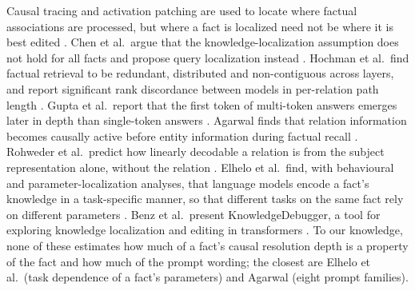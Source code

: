 Causal tracing and activation patching are used to locate where factual associations are processed, but where a fact is localized need not be where it is best edited \cite{hase2023}.
Chen et al.\ argue that the knowledge-localization assumption does not hold for all facts and propose query localization instead \cite{chen2024}.
Hochman et al.\ find factual retrieval to be redundant, distributed and non-contiguous across layers, and report significant rank discordance between models in per-relation path length \cite{hochman2026}.
Gupta et al.\ report that the first token of multi-token answers emerges later in depth than single-token answers \cite{gupta2025}.
Agarwal finds that relation information becomes causally active before entity information during factual recall \cite{agarwal2026}.
Rohweder et al.\ predict how linearly decodable a relation is from the subject representation alone, without the relation \cite{rohweder2026}.
Elhelo et al.\ find, with behavioural and parameter-localization analyses, that language models encode a fact's knowledge in a task-specific manner, so that different tasks on the same fact rely on different parameters \cite{elhelo2026}.
Benz et al.\ present KnowledgeDebugger, a tool for exploring knowledge localization and editing in transformers \cite{benz2026}.
To our knowledge, none of these estimates how much of a fact's causal resolution depth is a property of the fact and how much of the prompt wording; the closest are Elhelo et al.\ (task dependence of a fact's parameters) and Agarwal (eight prompt families).
